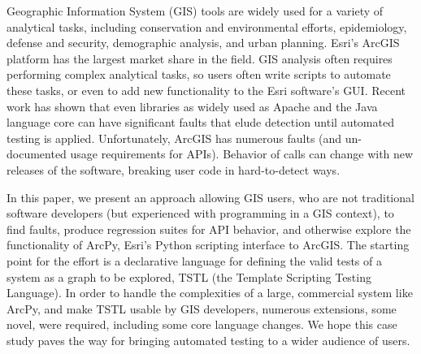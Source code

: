 Geographic Information System (GIS) tools are widely used for a variety of
analytical tasks, including conservation and environmental efforts,
epidemiology, defense and security, demographic analysis, and urban
planning.  Esri's ArcGIS platform has the largest market share in the
field.  GIS analysis often requires performing complex analytical
tasks, so users often write scripts to automate these tasks, or even
to add new functionality to the Esri software's GUI.  Recent work
has shown that even libraries as widely used as Apache and the Java
language core can have significant faults that elude detection until
automated testing is applied.  Unfortunately,  
ArcGIS has numerous faults (and un-documented usage requirements for
APIs).  Behavior of calls can change with new releases of the
software, breaking user code in hard-to-detect ways.

In this paper, we present an approach allowing GIS users, who are not
traditional software developers (but experienced with programming in a
GIS context), to find faults, produce regression suites for API
behavior, and otherwise explore the functionality of ArcPy, Esri's
Python scripting interface to ArcGIS.  The starting point for the
effort is a declarative language for defining the valid tests of a
system as a graph to be explored, TSTL (the Template Scripting Testing
Language).  In order to handle the complexities of a large, commercial
system like ArcPy, and make TSTL usable by GIS developers, numerous
extensions, some novel, were required, including some core language
changes.  We hope this case study paves the way for bringing automated
testing to a wider audience of users.
